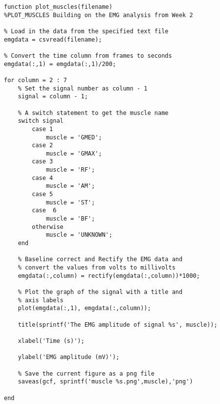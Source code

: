 \documentclass[12pt,a4paper]{article}
\begin{document}
\begin{lstlisting}[style=Matlab-editor]
function plot_muscles(filename)
%PLOT_MUSCLES Building on the EMG analysis from Week 2

% Load in the data from the specified text file
emgdata = csvread(filename);

% Convert the time column from frames to seconds
emgdata(:,1) = emgdata(:,1)/200;

for column = 2 : 7
    % Set the signal number as column - 1
    signal = column - 1;
		
    % A switch statement to get the muscle name
    switch signal
        case 1
            muscle = 'GMED';
        case 2
            muscle = 'GMAX';
        case 3
            muscle = 'RF';
        case 4
            muscle = 'AM';
        case 5
            muscle = 'ST';
        case  6
            muscle = 'BF';
        otherwise
            muscle = 'UNKNOWN';
    end
 
    % Baseline correct and Rectify the EMG data and 
    % convert the values from volts to millivolts
    emgdata(:,column) = rectify(emgdata(:,column))*1000;

    % Plot the graph of the signal with a title and 
    % axis labels
    plot(emgdata(:,1), emgdata(:,column));
    
    title(sprintf('The EMG amplitude of signal %s', muscle));
    
    xlabel('Time (s)');
    
    ylabel('EMG amplitude (mV)');

    % Save the current figure as a png file
    saveas(gcf, sprintf('muscle %s.png',muscle),'png')

end		
	\end{lstlisting}
\end{document}
